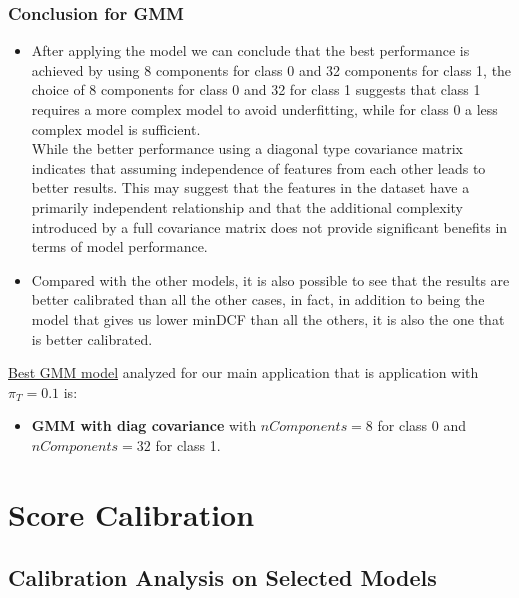 \documentclass{article}
\begin{document}
\subsubsection*{Conclusion for GMM}
\begin{itemize}
    \item  After applying the model we can conclude that the best performance is achieved by using 8 components for class 0 and 32 components for class 1, the choice of 8 components for class 0 and 32 for class 1 suggests that class 1 requires a more complex model to avoid underfitting, while for class 0 a less complex model is sufficient.\\
    While the better performance using a diagonal type covariance matrix indicates that assuming independence of features from each other leads to better results. This may suggest that the features in the dataset have a primarily independent relationship and that the additional complexity introduced by a full covariance matrix does not provide significant benefits in terms of model performance.
    \item Compared with the other models, it is also possible to see that the results are better calibrated than all the other cases, in fact, in addition to being the model that gives us lower minDCF than all the others, it is also the one that is better calibrated.
\end{itemize}
\underline{Best GMM model} analyzed for our main application that is application with \(\pi_T=0.1\) is:
\begin{itemize}
    \item \textbf{GMM with diag covariance} with \(nComponents=8\) for class 0 and \(nComponents=32\) for class 1.
\end{itemize}
\section{Score Calibration}
\subsection{Calibration Analysis on Selected Models}
\end{document}
